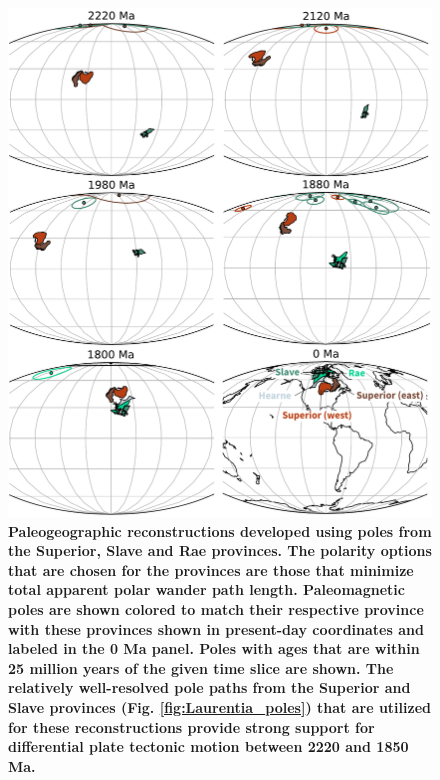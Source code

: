 \documentclass[11pt,letterpaper]{article}
\begin{document}
\begin{figure}
\centering
\includegraphics[width=\textwidth]{../Figures/Superior_Slave_reconstructions.pdf}
\caption{\small{\textbf{Paleogeographic reconstructions developed using poles from the Superior, Slave and Rae provinces. The polarity options that are chosen for the provinces are those that minimize total apparent polar wander path length. Paleomagnetic poles are shown colored to match their respective province with these provinces shown in present-day coordinates and labeled in the 0 Ma panel. Poles with ages that are within 25 million years of the given time slice are shown. The relatively well-resolved pole paths from the Superior and Slave provinces (Fig. \ref{fig:Laurentia_poles}) that are utilized for these reconstructions provide strong support for differential plate tectonic motion between 2220 and 1850 Ma.}}}
\label{fig:Superior_Slave_recons}
\end{figure} 
\end{document}
